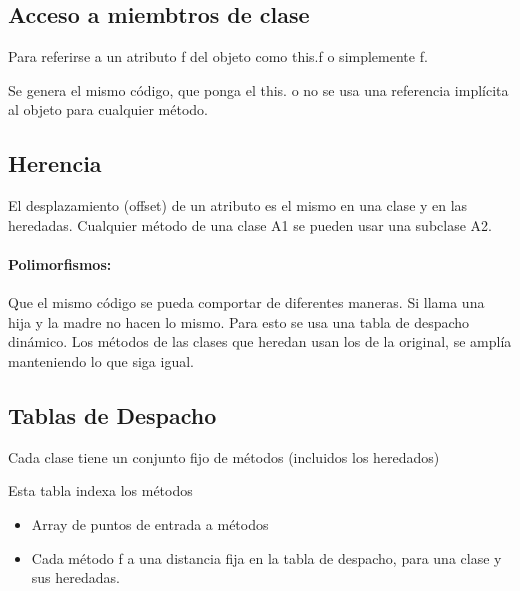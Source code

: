 \documentclass[12pt, twoside, openright]{report} %
\begin{document}
\subsection{Acceso a miembtros de clase}
Para referirse a un atributo f del objeto como this.f o simplemente f.

Se genera el mismo código, que ponga el this. o no se usa una referencia implícita al objeto para cualquier método.

\subsection{Herencia}
El desplazamiento (offset) de un atributo es el mismo en una clase y en las heredadas. Cualquier método de una clase A1 se pueden usar una subclase A2.

\paragraph{Polimorfismos:} Que el mismo código se pueda comportar de diferentes maneras. Si llama una hija y la madre no hacen lo mismo. Para esto se usa una tabla de despacho dinámico.
Los métodos de las clases que heredan usan los de la original, se amplía manteniendo lo que siga igual.
\pagebreak
\subsection{Tablas de Despacho}
Cada clase tiene un conjunto fijo de métodos (incluidos los heredados)

Esta tabla indexa los métodos
\begin{itemize}
  \item Array de puntos de entrada a métodos
  \item Cada método f a una distancia fija en la tabla de despacho, para una clase y sus heredadas.
\end{itemize}
\end{document}
